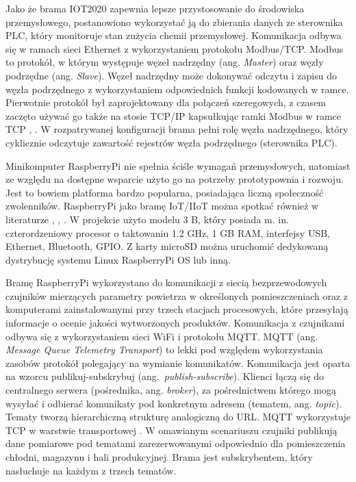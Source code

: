 \documentclass[a4paper, 12pt, twoside]{article}
\begin{document}
Jako że brama IOT2020 zapewnia lepsze przystosowanie do środowiska przemysłowego,
postanowiono wykorzystać ją do zbierania danych ze sterownika PLC, który
monitoruje stan zużycia chemii przemysłowej. Komunikacja odbywa się w ramach
sieci Ethernet z wykorzystaniem protokołu Modbus/TCP. Modbus to protokół,
w którym występuje węzeł nadrzędny (ang. \emph{Master}) oraz węzły
podrzędne (ang. \emph{Slave}). Węzeł nadrzędny może dokonywać odczytu i zapisu
do węzła podrzędnego z wykorzystaniem odpowiednich funkcji kodowanych w ramce.
Pierwotnie protokół był zaprojektowany dla połączeń szeregowych, z czasem
zaczęto używać go także na stosie TCP/IP kapsułkując ramki Modbus w ramce TCP
\cite{isp}, \cite{isp-analiza-przepływu-informacji}. W rozpatrywanej konfiguracji
brama pełni rolę węzła nadrzędnego, który cyklicznie odczytuje zawartość
rejestrów węzła podrzędnego (sterownika PLC).

Minikomputer RaspberryPi nie spełnia ściśle wymagań przemysłowych, natomiast ze
względu na dostępne wsparcie użyto go na potrzeby prototypownia i rozwoju.
Jest to bowiem platforma bardzo popularna, posiadająca liczną społeczność zwolenników.
RaspberryPi jako bramę IoT/IIoT można spotkać również w literaturze \cite{iiot-opensource-gateway},
\cite{design-impl-node-gateway}, \cite{low-cost-esp32-pi-node-red-scada}.
W projekcie użyto modelu 3 B, który posiada m. in. czterordzeniowy
procesor o taktowaniu 1.2 GHz, 1 GB RAM, interfejsy USB, Ethernet, Bluetooth, GPIO.
Z karty microSD można uruchomić dedykowaną dystrybucję systemu Linux RaspberryPi OS lub inną.

Bramę RaspberryPi wykorzystano do komunikacji z siecią bezprzewodowych czujników
mierzących parametry powietrza w określonych pomieszczeniach oraz z
komputerami zainstalowanymi przy trzech stacjach procesowych, które
przesyłają informacje o ocenie jakości wytworzonych produktów.
Komunikacja z czujnikami odbywa się z wykorzystaniem sieci WiFi i protokołu
MQTT. MQTT (ang. \emph{Message Queue Telemetry Transport}) to lekki pod względem wykorzystania zasobów
protokół polegający na wymianie komunikatów. Komunikacja
jest oparta na wzorcu publikuj-subskrybuj (ang.~\emph{publish-subscribe}).
Klienci łączą się do centralnego serwera (pośrednika, ang. \emph{broker}), za pośrednictwem
którego mogą wysyłać i odbierać komunikaty pod konkretnym adresem (tematem, ang. \emph{topic}).
Tematy tworzą hierarchiczną strukturę analogiczną do URL. MQTT
wykorzystuje TCP w warstwie transportowej \cite{iot-hype-to-reality}. W omawianym
scenariuszu czujniki publikują dane pomiarowe pod tematami zarezerwowanymi
odpowiednio dla pomieszczenia chłodni, magazynu i hali produkcyjnej. Brama
jest subskrybentem, który nasłuchuje na każdym z trzech tematów.
\end{document}
